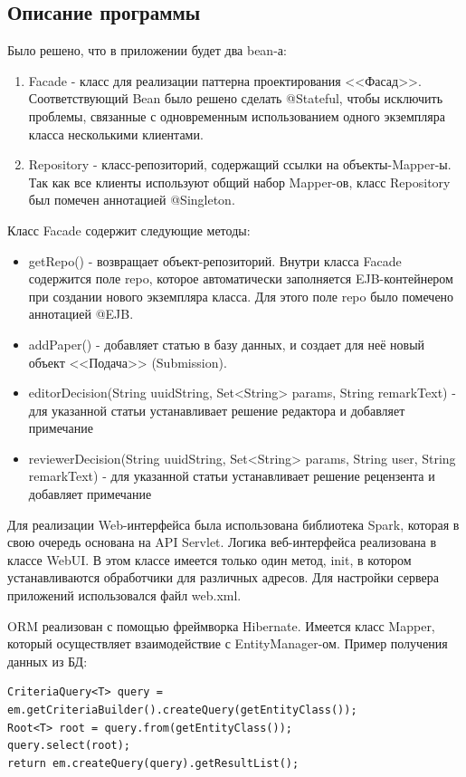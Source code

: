 \subsection{Описание программы}

Было решено, что в приложении будет два bean-а:
\begin{enumerate}
\item Facade - класс для реализации паттерна проектирования <<Фасад>>. Соответствующий Bean было решено сделать @Stateful, чтобы исключить проблемы, связанные с одновременным использованием одного экземпляра класса несколькими клиентами.
\item Repository - класс-репозиторий, содержащий ссылки на объекты-Mapper-ы. Так как все клиенты используют общий набор Mapper-ов, класс Repository был помечен аннотацией @Singleton.
\end{enumerate}

Класс Facade содержит следующие методы:

\begin{itemize}
\item getRepo() - возвращает объект-репозиторий. Внутри класса Facade содержится поле repo, которое автоматически заполняется EJB-контейнером при создании нового экземпляра класса. Для этого поле repo было помечено аннотацией @EJB.
\item addPaper() - добавляет статью в базу данных, и создает для неё новый объект <<Подача>> (Submission).
\item editorDecision(String uuidString, Set<String> params, String remarkText) - для указанной статьи устанавливает решение редактора и добавляет примечание
\item reviewerDecision(String uuidString, Set<String> params, String user, String remarkText) - для указанной статьи устанавливает решение рецензента и добавляет примечание
\end{itemize}

Для реализации Web-интерфейса была использована библиотека Spark, которая в свою очередь основана на API Servlet. Логика веб-интерфейса реализована в классе WebUI. В этом классе имеется только один метод, init, в котором устанавливаются обработчики для различных адресов. Для настройки сервера приложений использовался файл web.xml.

ORM реализован с помощью фреймворка Hibernate. Имеется класс Mapper, который осуществляет взаимодействие с EntityManager-ом. Пример получения данных из БД:

\begin{lstlisting}
CriteriaQuery<T> query = em.getCriteriaBuilder().createQuery(getEntityClass());
Root<T> root = query.from(getEntityClass());
query.select(root);
return em.createQuery(query).getResultList();
\end{lstlisting}

